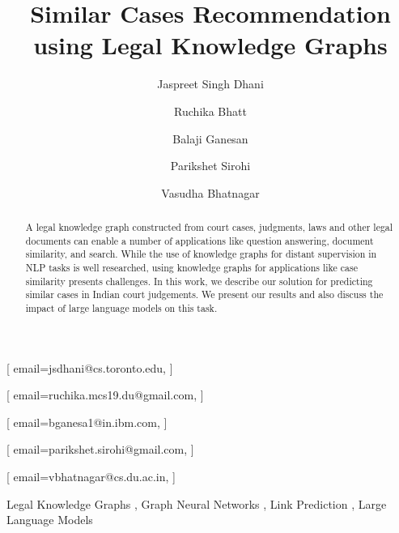 \documentclass[12pt]{ceurart}
\begin{document}


\title{Similar Cases Recommendation using Legal Knowledge Graphs}

\author[1,3]{Jaspreet Singh Dhani}[%
email=jsdhani@cs.toronto.edu,
]
\address[1]{University of Delhi, New Delhi, India}

\author[1]{Ruchika Bhatt}[%
email=ruchika.mcs19.du@gmail.com,
]

\author[2]{Balaji Ganesan}[%
email=bganesa1@in.ibm.com,
]
\address[2]{IBM Research, Bengaluru, India}

\author[1]{Parikshet Sirohi}[%
email=parikshet.sirohi@gmail.com,
]

\author[1]{Vasudha Bhatnagar}[%
email=vbhatnagar@cs.du.ac.in,
]
\address[3]{University of Toronto, Toronto, Canada}


\begin{abstract}
A legal knowledge graph constructed from court cases, judgments, laws and other legal documents can enable a number of applications like question answering, document similarity, and search. While the use of knowledge graphs for distant supervision in NLP tasks is well researched, using knowledge graphs for applications like case similarity presents challenges. In this work, we describe our solution for predicting similar cases in Indian court judgements. We present our results and also discuss the impact of large language models on this task.
\end{abstract}

\begin{keywords}
  Legal Knowledge Graphs \sep
  Graph Neural Networks \sep
  Link Prediction \sep
  Large Language Models
\end{keywords}
\end{document}
